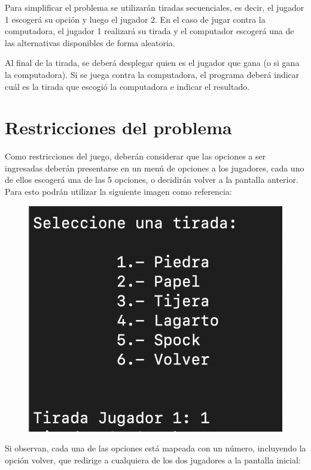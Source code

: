 \documentclass[]{article}
\begin{document}
    Para simplificar el problema se utilizarán tiradas secuenciales, es decir, el jugador 1 escogerá su opción y luego el jugador 2. En el caso de jugar contra la computadora, el jugador 1 realizará su tirada y el computador escogerá una de las alternativas disponibles de forma aleatoria.

    Al final de la tirada, se deberá desplegar quien es el jugador que gana (o si gana la computadora). Si se juega contra la computadora, el programa deberá indicar cuál es la tirada que escogió la computadora e indicar el resultado.

    \section{Restricciones del problema}
    Como restricciones del juego, deberán considerar que las opciones a ser ingresadas deberán presentarse en un menú de opciones a los jugadores, cada uno de ellos escogerá una de las 5 opciones, o decidirán volver a la pantalla anterior. Para esto podrán utilizar la siguiente imagen como referencia:

    \begin{figure}[H]
        \includegraphics[scale=0.5]{ejMenuJugador}
    \end{figure}

    Si observan, cada una de las opciones está mapeada con un número, incluyendo la opción volver, que redirige a cualquiera de los dos jugadores a la pantalla inicial:
\end{document}
